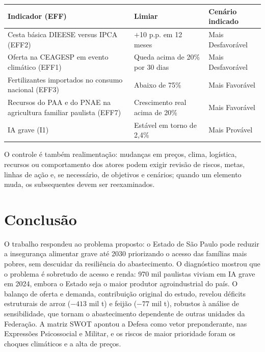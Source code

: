 \documentclass[
	12pt,				%
	openright,			%
	oneside,			%
	a4paper,			%
	chapter=TITLE,		%
	section=TITLE,		%
	english,			%
	french,				%
	spanish,			%
	brazil,				%
 ]{abntex2}
\begin{document}
\begin{quadro}[!htbp]
\centering
\caption{Sinais de alerta por cenário}
\label{qua:sinais-alerta}
\footnotesize
\renewcommand{\arraystretch}{1.05}
\setlength{\tabcolsep}{3pt}
\begin{tabularx}{\textwidth}{|>{\raggedright\arraybackslash}X|>{\raggedright\arraybackslash}p{4.6cm}|>{\raggedright\arraybackslash}p{3.0cm}|}
\hline
\textbf{Indicador (EFF)} & \textbf{Limiar} & \textbf{Cenário indicado} \\
\hline
Cesta básica DIEESE versus IPCA (EFF2) & $+$10 p.p. em 12 meses & Mais Desfavorável \\
\hline
Oferta na CEAGESP em evento climático (EFF1) & Queda acima de 20\% por 30 dias & Mais Desfavorável \\
\hline
Fertilizantes importados no consumo nacional (EFF3) & Abaixo de 75\% & Mais Favorável \\
\hline
Recursos do PAA e do PNAE na agricultura familiar paulista (EFF7) & Crescimento real acima de 20\% & Mais Favorável \\
\hline
IA grave (I1) & Estável em torno de 2,4\% & Mais Provável \\
\hline
\end{tabularx}
\end{quadro}

O controle é também realimentação: mudanças em preços, clima, logística,
recursos ou comportamento dos atores podem exigir revisão de riscos, metas,
linhas de ação e, se necessário, de objetivos e cenários; quando um elemento
muda, os subsequentes devem ser reexaminados.

\chapter{Conclusão}
O trabalho respondeu ao problema proposto: o Estado de São Paulo pode reduzir a
insegurança alimentar grave até 2030 priorizando o acesso das famílias mais
pobres, sem descuidar da resiliência do abastecimento. O diagnóstico mostrou que
o problema é sobretudo de acesso e renda: 970 mil paulistas viviam em IA grave
em 2024, embora o Estado seja o maior produtor agroindustrial do país. O
balanço de oferta e demanda, contribuição original do estudo, revelou déficits
estruturais de arroz ($-413$ mil t) e feijão ($-77$ mil t), robustos à análise de
sensibilidade, que tornam o abastecimento dependente de outras unidades da
Federação. A matriz SWOT apontou a Defesa como vetor preponderante, nas
Expressões Psicossocial e Militar, e os riscos de maior prioridade foram os
choques climáticos e a alta de preços.
\end{document}
